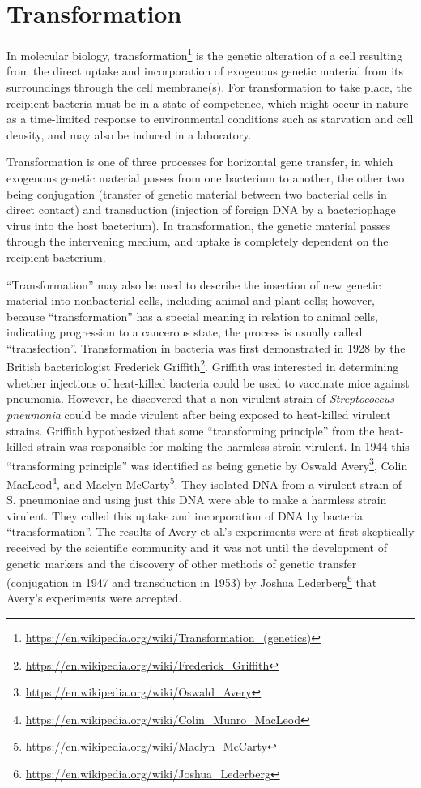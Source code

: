 \documentclass[]{book}
\let\rmarkdownfootnote\footnote%
\def\footnote{\protect\rmarkdownfootnote}
\renewcommand{\href}[2]{#2\footnote{\url{#1}}}
\theoremstyle{definition}
\theoremstyle{definition}
\theoremstyle{definition}
\theoremstyle{remark}
\begin{document}
\section{Transformation}\label{transformation}

In molecular biology,
\href{https://en.wikipedia.org/wiki/Transformation_(genetics)}{transformation}
is the genetic alteration of a cell resulting from the direct uptake and
incorporation of exogenous genetic material from its surroundings
through the cell membrane(s). For transformation to take place, the
recipient bacteria must be in a state of competence, which might occur
in nature as a time-limited response to environmental conditions such as
starvation and cell density, and may also be induced in a laboratory.

Transformation is one of three processes for horizontal gene transfer,
in which exogenous genetic material passes from one bacterium to
another, the other two being conjugation (transfer of genetic material
between two bacterial cells in direct contact) and transduction
(injection of foreign DNA by a bacteriophage virus into the host
bacterium). In transformation, the genetic material passes through the
intervening medium, and uptake is completely dependent on the recipient
bacterium.

``Transformation'' may also be used to describe the insertion of new
genetic material into nonbacterial cells, including animal and plant
cells; however, because ``transformation'' has a special meaning in
relation to animal cells, indicating progression to a cancerous state,
the process is usually called ``transfection''. Transformation in
bacteria was first demonstrated in 1928 by the British bacteriologist
\href{https://en.wikipedia.org/wiki/Frederick_Griffith}{Frederick
Griffith}. Griffith was interested in determining whether injections of
heat-killed bacteria could be used to vaccinate mice against pneumonia.
However, he discovered that a non-virulent strain of \emph{Streptococcus
pneumonia} could be made virulent after being exposed to heat-killed
virulent strains. Griffith hypothesized that some ``transforming
principle'' from the heat-killed strain was responsible for making the
harmless strain virulent. In 1944 this ``transforming principle'' was
identified as being genetic by
\href{https://en.wikipedia.org/wiki/Oswald_Avery}{Oswald Avery},
\href{https://en.wikipedia.org/wiki/Colin_Munro_MacLeod}{Colin MacLeod},
and \href{https://en.wikipedia.org/wiki/Maclyn_McCarty}{Maclyn McCarty}.
They isolated DNA from a virulent strain of S. pneumoniae and using just
this DNA were able to make a harmless strain virulent. They called this
uptake and incorporation of DNA by bacteria ``transformation''. The
results of Avery et al.'s experiments were at first skeptically received
by the scientific community and it was not until the development of
genetic markers and the discovery of other methods of genetic transfer
(conjugation in 1947 and transduction in 1953) by
\href{https://en.wikipedia.org/wiki/Joshua_Lederberg}{Joshua Lederberg}
that Avery's experiments were accepted.
\end{document}
